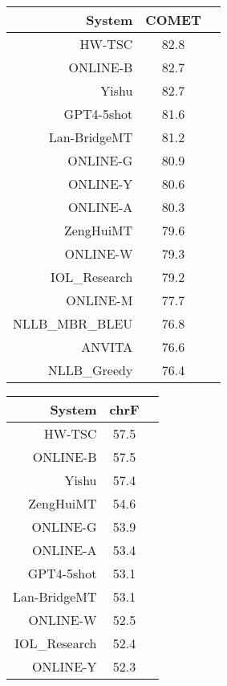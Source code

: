 \documentclass[11pt]{article}
\begin{document}
\begin{table}  
\scriptsize
\begin{subtable}[t]{0.33\textwidth}
\begin{tabular}{rcc}
\toprule 
System  & COMET \\ 
\midrule 
HW-TSC  & 82.8 \\ 
\rowcolor{ashgrey} ONLINE-B  & 82.7 \\ 
\rowcolor{ashgrey} Yishu  & 82.7 \\ 
\rowcolor{ashgrey} GPT4-5shot  & 81.6 \\ 
\rowcolor{ashgrey} Lan-BridgeMT  & 81.2 \\ 
\rowcolor{ashgrey} ONLINE-G  & 80.9 \\ 
\rowcolor{ashgrey} ONLINE-Y  & 80.6 \\ 
\rowcolor{ashgrey} ONLINE-A  & 80.3 \\ 
\rowcolor{ashgrey} ZengHuiMT  & 79.6 \\ 
\rowcolor{ashgrey} ONLINE-W  & 79.3 \\ 
IOL\_Research  & 79.2 \\ 
\rowcolor{ashgrey} ONLINE-M  & 77.7 \\ 
\rowcolor{ashgrey} NLLB\_MBR\_BLEU  & 76.8 \\ 
ANVITA  & 76.6 \\ 
\rowcolor{ashgrey} NLLB\_Greedy  & 76.4 \\ 
\bottomrule 
\end{tabular} 
\end{subtable}
\begin{subtable}[t]{0.33\textwidth}
\begin{tabular}{rcc}
\toprule 
System  & chrF \\ 
\midrule 
HW-TSC  & 57.5 \\ 
\rowcolor{ashgrey} ONLINE-B  & 57.5 \\ 
\rowcolor{ashgrey} Yishu  & 57.4 \\ 
\rowcolor{ashgrey} ZengHuiMT  & 54.6 \\ 
\rowcolor{ashgrey} ONLINE-G  & 53.9 \\ 
\rowcolor{ashgrey} ONLINE-A  & 53.4 \\ 
\rowcolor{ashgrey} GPT4-5shot  & 53.1 \\ 
\rowcolor{ashgrey} Lan-BridgeMT & 53.1 \\ 
\rowcolor{ashgrey} ONLINE-W  & 52.5 \\ 
IOL\_Research  & 52.4 \\ 
\rowcolor{ashgrey} ONLINE-Y & 52.3 \\ 

\end{tabular}
\end{subtable}
\end{table}
\end{document}
